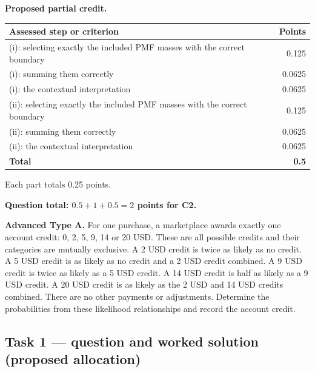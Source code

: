 \par\smallskip
\noindent\begin{minipage}{\linewidth}
\textbf{Proposed partial credit.}\par\smallskip
\begin{tabularx}{\linewidth}{@{}>{\raggedright\arraybackslash}X r@{}}\toprule
\textbf{Assessed step or criterion} & \textbf{Points}\\\midrule
(i): selecting exactly the included PMF masses with the correct boundary & 0.125\\
(i): summing them correctly & 0.0625\\
(i): the contextual interpretation & 0.0625\\
(ii): selecting exactly the included PMF masses with the correct boundary & 0.125\\
(ii): summing them correctly & 0.0625\\
(ii): the contextual interpretation & 0.0625\\
\midrule
\textbf{Total} & \textbf{0.5}\\
\bottomrule\end{tabularx}
\end{minipage}\par\smallskip

Each part totals 0.25 points.

\par\vspace{3mm}\secInicio[][sec:q4]

\textbf{Question total: $0.5+1+0.5=2$ points for C2.}

\clearpage
{}

\textbf{Advanced Type A.} For one purchase, a marketplace awards exactly one account credit: 0, 2, 5, 9, 14 or 20 USD. These are all possible credits and their categories are mutually exclusive. A 2 USD credit is twice as likely as no credit. A 5 USD credit is as likely as no credit and a 2 USD credit combined. A 9 USD credit is twice as likely as a 5 USD credit. A 14 USD credit is half as likely as a 9 USD credit. A 20 USD credit is as likely as the 2 USD and 14 USD credits combined. There are no other payments or adjustments. Determine the probabilities from these likelihood relationships and record the account credit.

\subsection*{Task 1 --- question and worked solution (proposed allocation) }
\label{sol:q5t1}

